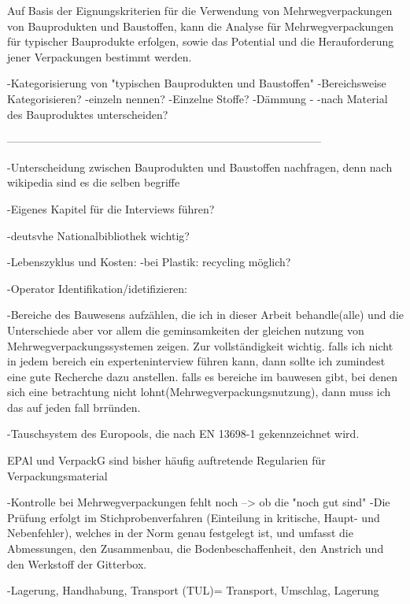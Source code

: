            Auf Basis der Eignungskriterien für die Verwendung von Mehrwegverpackungen von Bauprodukten und Baustoffen, kann die Analyse für Mehrwegverpackungen für typischer Bauprodukte erfolgen, sowie das Potential und die Herauforderung jener Verpackungen bestimmt werden. 
            
    -Kategorisierung von "typischen Bauprodukten und Baustoffen"
            -Bereichsweise Kategorisieren?
            -einzeln nennen?
            -Einzelne Stoffe?
                -Dämmung
                -
            -nach Material des Bauproduktes unterscheiden? 
    
--------------------------------------------------------------------------------------    
    
    -Unterscheidung zwischen Bauprodukten und Baustoffen nachfragen, denn nach wikipedia sind es die selben begriffe
        
        
    -Eigenes Kapitel für die Interviews führen?
    
    -deutsvhe Nationalbibliothek wichtig?
    
    -Lebenszyklus und Kosten:
        -bei Plastik: recycling möglich?
        
    -Operator Identifikation/idetifizieren:
            
    -Bereiche des Bauwesens aufzählen, die ich in dieser Arbeit behandle(alle) und die Unterschiede aber vor allem die geminsamkeiten der gleichen nutzung von Mehrwegverpackungssystemen zeigen. Zur vollständigkeit wichtig. falls ich nicht in jedem bereich ein experteninterview führen kann, dann sollte ich zumindest eine gute Recherche dazu anstellen. falls es bereiche im bauwesen gibt, bei denen sich eine betrachtung nicht lohnt(Mehrwegverpackungsnutzung), dann muss ich das auf jeden fall brründen.
    
    -Tauschsystem des Europools, die nach EN 13698-1 gekennzeichnet wird.
    
    EPAl und VerpackG sind bisher häufig auftretende Regularien für Verpackungsmaterial
    
    -Kontrolle bei Mehrwegverpackungen fehlt noch
        --> ob die "noch gut sind"
                -Die Prüfung erfolgt im Stichprobenverfahren (Einteilung in kritische, Haupt- und Nebenfehler), welches in der Norm genau festgelegt ist, und umfasst die Abmessungen, den Zusammenbau, die Bodenbeschaffenheit, den Anstrich und den Werkstoff der Gitterbox.

 -Lagerung, Handhabung, Transport (TUL)= Transport, Umschlag, Lagerung
 
